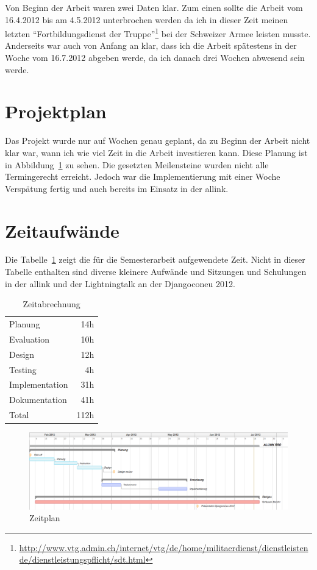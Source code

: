 Von Beginn der Arbeit waren zwei Daten klar. Zum einen sollte die Arbeit vom 16.4.2012 bis am 4.5.2012 unterbrochen werden da ich in dieser Zeit meinen letzten ``Fortbildungsdienst der Truppe''\footnote{\url{http://www.vtg.admin.ch/internet/vtg/de/home/militaerdienst/dienstleistende/dienstleistungspflicht/sdt.html}} bei der Schweizer Armee leisten musste. Anderseits war auch von Anfang an klar, dass ich die Arbeit spätestens in der Woche vom 16.7.2012 abgeben werde, da ich danach drei Wochen abwesend sein werde.

\section{Projektplan}
\label{sec:projektplan}
Das Projekt wurde nur auf Wochen genau geplant, da zu Beginn der Arbeit nicht klar war, wann ich wie viel Zeit in die Arbeit investieren kann. Diese Planung ist in Abbildung~\ref{fig:zeitplan} zu sehen. Die gesetzten Meilensteine wurden nicht alle Termingerecht erreicht. Jedoch war die Implementierung mit einer Woche Verspätung fertig und auch bereits im Einsatz in der allink.

\section{Zeitaufwände}
\label{sec:zeitaufwände}
Die Tabelle~\ref{tab:zeitabrechnung} zeigt die für die Semesterarbeit aufgewendete Zeit. Nicht in dieser Tabelle enthalten sind diverse kleinere Aufwände und Sitzungen und Schulungen in der allink und der Lightningtalk an der Djangoconeu 2012.
\begin{table}[ht]
  \centering
  \begin{tabular}{lr}
    Planung & 14h \\
    Evaluation & 10h \\
    Design & 12h \\
    Testing & 4h \\
    Implementation & 31h \\
    Dokumentation & 41h \\
    \hline
    Total & 112h \\
  \end{tabular}
  \caption{Zeitabrechnung}
  \label{tab:zeitabrechnung}
\end{table}

\begin{figure}
  \centering
	\includegraphics[width=21cm, angle=90]{include/zeitplan.png}
	\caption{Zeitplan}
	\label{fig:zeitplan}
\end{figure}
